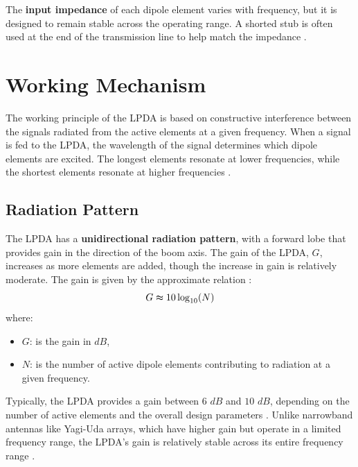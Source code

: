 \documentclass[a4paper, 12pt, english]{article}
\begin{document}
The \textbf{input impedance} of each dipole element varies with frequency, but it is designed to remain stable across the operating range. A shorted stub is often used at the end of the transmission line to help match the impedance \cite{nakano1996wideband}.

\section{Working Mechanism}
The working principle of the LPDA is based on constructive interference between the signals radiated from the active elements at a given frequency. When a signal is fed to the LPDA, the wavelength of the signal determines which dipole elements are excited. The longest elements resonate at lower frequencies, while the shortest elements resonate at higher frequencies \cite{balanis2016antenna}.
\subsection{Radiation Pattern}
The LPDA has a \textbf{unidirectional radiation pattern}, with a forward lobe that provides gain in the direction of the boom axis. The gain of the LPDA, $ { G } $, increases as more elements are added, though the increase in gain is relatively moderate. The gain is given by the approximate relation \cite{arrl2014antenna}:
\[ G \thickapprox 10 \log _ { 10 } ( N ) \]
where:
\begin{itemize}
    \item $ G $: is the gain in $ { dB } $,
    \item  $ N $: is the number of active dipole elements contributing to radiation at a given frequency.
\end{itemize}
Typically, the LPDA provides a gain between $ 6 $ $ dB $ and $ 10 $ $ dB $, depending on the number of active elements and the overall design parameters \cite{carrel1966design}. Unlike narrowband antennas like Yagi-Uda arrays, which have higher gain but operate in a limited frequency range, the LPDA’s gain is relatively stable across its entire frequency range \cite{balanis2016antenna}.

\newpage
\end{document}
